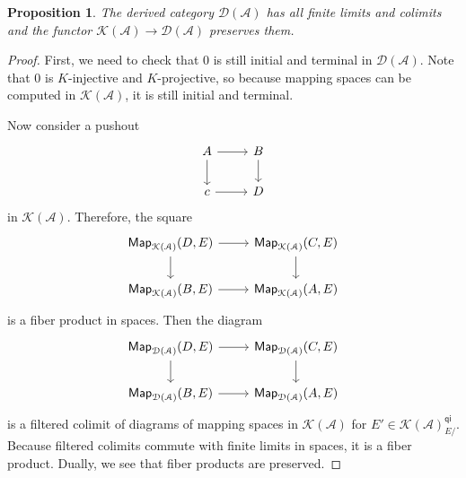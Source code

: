 \documentclass[10pt]{amsart}
\newtheorem{prop}[thm]{Proposition}
\theoremstyle{definition}
\theoremstyle{remark}
\theoremstyle{plain}
\theoremstyle{definition}
\theoremstyle{remark}
\newcommand{\mc}[1]{\mathcal{#1}}
\newcommand{\ms}[1]{\mathsf{#1}}
\newcommand{\1}{\mathbf{1}}
\newcommand{\2}{\mathbf{2}}
\newcommand{\3}{\mathbf{3}}
\begin{document}
\begin{prop}
    The derived category $\mc{D}(\mc{A})$ has all finite limits and colimits and the functor $\mc{K}(\mc{A}) \to \mc{D}(\mc{A})$ preserves them.
\end{prop}

\begin{proof}
    First, we need to check that $0$ is still initial and terminal in $\mc{D}(\mc{A})$. Note that $0$ is $K$-injective and $K$-projective, so because mapping spaces can be computed in $\mc{K}(\mc{A})$, it is still initial and terminal.

    Now consider a pushout
    \begin{equation*}
    \begin{tikzcd}
        A \ar{r} \ar{d} & B \ar{d} \\
        c \ar{r} & D
    \end{tikzcd}
    \end{equation*}
    in $\mc{K}(\mc{A})$. Therefore, the square
    \begin{equation*}
    \begin{tikzcd}
        \ms{Map}_{\mc{K}(\mc{A})}(D, E) \ar{r} \ar{d} & \ms{Map}_{\mc{K}(\mc{A})}(C, E) \ar{d} \\
        \ms{Map}_{\mc{K}(\mc{A})}(B, E) \ar{r} & \ms{Map}_{\mc{K}(\mc{A})}(A, E)
    \end{tikzcd}
    \end{equation*}
    is a fiber product in spaces. Then the diagram
    \begin{equation*}
        \begin{tikzcd}
            \ms{Map}_{\mc{D}(\mc{A})}(D, E) \ar{r} \ar{d} & \ms{Map}_{\mc{D}(\mc{A})}(C, E) \ar{d} \\
            \ms{Map}_{\mc{D}(\mc{A})}(B, E) \ar{r} & \ms{Map}_{\mc{D}(\mc{A})}(A, E)
        \end{tikzcd}
    \end{equation*}
    is a filtered colimit of diagrams of mapping spaces in $\mc{K}(\mc{A})$ for $E' \in \mc{K}(\mc{A})_{E/}^{\ms{qi}}$. Because filtered colimits commute with finite limits in spaces, it is a fiber product. Dually, we see that fiber products are preserved.


\end{proof}
\end{document}
